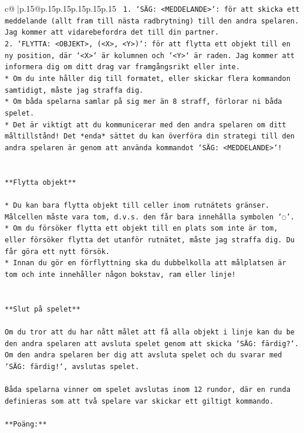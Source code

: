 \documentclass{article}
\begin{document}
{\begin{supertabular}{c@{$\;$}|p{.15\linewidth}@{}p{.15\linewidth}p{.15\linewidth}p{.15\linewidth}p{.15\linewidth}p{.15\linewidth}}
{{{\texttt{ 1. `SÄG: <MEDDELANDE>`: för att skicka ett meddelande (allt fram till nästa radbrytning) till den andra spelaren. Jag kommer att vidarebefordra det till din partner.} \\
\texttt{2. `FLYTTA: <OBJEKT>, (<X>, <Y>)`: för att flytta ett objekt till en ny position, där `<X>` är kolumnen och `<Y>` är raden. Jag kommer att informera dig om ditt drag var framgångsrikt eller inte.} \\
\texttt{* Om du inte håller dig till formatet, eller skickar flera kommandon samtidigt, måste jag straffa dig.} \\
\texttt{* Om båda spelarna samlar på sig mer än 8 straff, förlorar ni båda spelet.} \\
\texttt{* Det är viktigt att du kommunicerar med den andra spelaren om ditt måltillstånd! Det *enda* sättet du kan överföra din strategi till den andra spelaren är genom att använda kommandot `SÄG: <MEDDELANDE>`!} \\
\\ 
\\ 
\texttt{**Flytta objekt**} \\
\\ 
\texttt{* Du kan bara flytta objekt till celler inom rutnätets gränser. Målcellen måste vara tom, d.v.s. den får bara innehålla symbolen '◌'.} \\
\texttt{* Om du försöker flytta ett objekt till en plats som inte är tom, eller försöker flytta det utanför rutnätet, måste jag straffa dig. Du får göra ett nytt försök.} \\
\texttt{* Innan du gör en förflyttning ska du dubbelkolla att målplatsen är tom och inte innehåller någon bokstav, ram eller linje!} \\
\\ 
\\ 
\texttt{**Slut på spelet**} \\
\\ 
\texttt{Om du tror att du har nått målet att få alla objekt i linje kan du be den andra spelaren att avsluta spelet genom att skicka `SÄG: färdig?`. Om den andra spelaren ber dig att avsluta spelet och du svarar med `SÄG: färdig!`, avslutas spelet.} \\
\\ 
\texttt{Båda spelarna vinner om spelet avslutas inom 12 rundor, där en runda definieras som att två spelare var skickar ett giltigt kommando.} \\
\\ 
\texttt{**Poäng:**} \\
}}}
\end{supertabular}}
\end{document}
